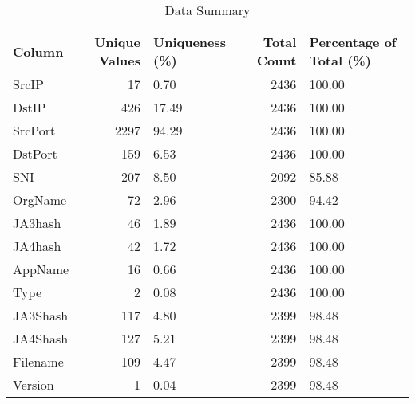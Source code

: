 \begin{table}
\caption{Data Summary}
\label{tab:data_summary}
\begin{tabular}{lrlrl}
\toprule
Column & Unique Values & Uniqueness (\%) & Total Count & Percentage of Total (\%) \\
\midrule
SrcIP & 17 & 0.70 & 2436 & 100.00 \\
DstIP & 426 & 17.49 & 2436 & 100.00 \\
SrcPort & 2297 & 94.29 & 2436 & 100.00 \\
DstPort & 159 & 6.53 & 2436 & 100.00 \\
SNI & 207 & 8.50 & 2092 & 85.88 \\
OrgName & 72 & 2.96 & 2300 & 94.42 \\
JA3hash & 46 & 1.89 & 2436 & 100.00 \\
JA4hash & 42 & 1.72 & 2436 & 100.00 \\
AppName & 16 & 0.66 & 2436 & 100.00 \\
Type & 2 & 0.08 & 2436 & 100.00 \\
JA3Shash & 117 & 4.80 & 2399 & 98.48 \\
JA4Shash & 127 & 5.21 & 2399 & 98.48 \\
Filename & 109 & 4.47 & 2399 & 98.48 \\
Version & 1 & 0.04 & 2399 & 98.48 \\
\bottomrule
\end{tabular}
\end{table}
